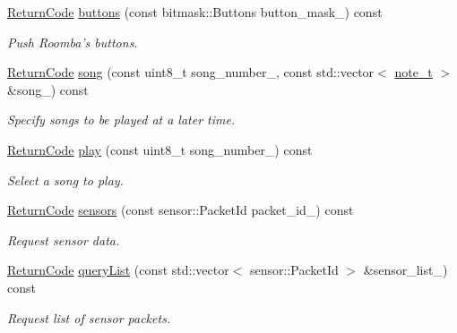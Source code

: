 \begin{DoxyCompactItemize}
\hyperlink{classroomba_1_1series500_1_1oi_1_1_o_i_encoder_ac2c8ad2f0306050926f89882d74696cc}{Return\+Code} \hyperlink{classroomba_1_1series500_1_1oi_1_1_o_i_encoder_ad1b02e78c92ebde01bfda683618c8a05}{buttons} (const bitmask\+::\+Buttons button\+\_\+mask\+\_\+) const 
\begin{DoxyCompactList}\small\item\em Push Roomba’s buttons. \end{DoxyCompactList}\item 
\hyperlink{classroomba_1_1series500_1_1oi_1_1_o_i_encoder_ac2c8ad2f0306050926f89882d74696cc}{Return\+Code} \hyperlink{classroomba_1_1series500_1_1oi_1_1_o_i_encoder_a420d412677b5359d413f0baf729a13e3}{song} (const uint8\+\_\+t song\+\_\+number\+\_\+, const std\+::vector$<$ \hyperlink{classroomba_1_1series500_1_1oi_1_1_o_i_encoder_ab4b7bf89bb873d838512791e339694fd}{note\+\_\+t} $>$ \&song\+\_\+) const 
\begin{DoxyCompactList}\small\item\em Specify songs to be played at a later time. \end{DoxyCompactList}\item 
\hyperlink{classroomba_1_1series500_1_1oi_1_1_o_i_encoder_ac2c8ad2f0306050926f89882d74696cc}{Return\+Code} \hyperlink{classroomba_1_1series500_1_1oi_1_1_o_i_encoder_af555b482307a4918c2b98eea4d8f2ba2}{play} (const uint8\+\_\+t song\+\_\+number\+\_\+) const 
\begin{DoxyCompactList}\small\item\em Select a song to play. \end{DoxyCompactList}\item 
\hyperlink{classroomba_1_1series500_1_1oi_1_1_o_i_encoder_ac2c8ad2f0306050926f89882d74696cc}{Return\+Code} \hyperlink{classroomba_1_1series500_1_1oi_1_1_o_i_encoder_a84fbcbb2bca5e68e163c7df0e0cfae7b}{sensors} (const sensor\+::\+Packet\+Id packet\+\_\+id\+\_\+) const 
\begin{DoxyCompactList}\small\item\em Request sensor data. \end{DoxyCompactList}\item 
\hyperlink{classroomba_1_1series500_1_1oi_1_1_o_i_encoder_ac2c8ad2f0306050926f89882d74696cc}{Return\+Code} \hyperlink{classroomba_1_1series500_1_1oi_1_1_o_i_encoder_a05c85b8943ee3c596c814c24fd5a9607}{query\+List} (const std\+::vector$<$ sensor\+::\+Packet\+Id $>$ \&sensor\+\_\+list\+\_\+) const 
\begin{DoxyCompactList}\small\item\em Request list of sensor packets. \end{DoxyCompactList}\item 

\end{DoxyCompactItemize}

